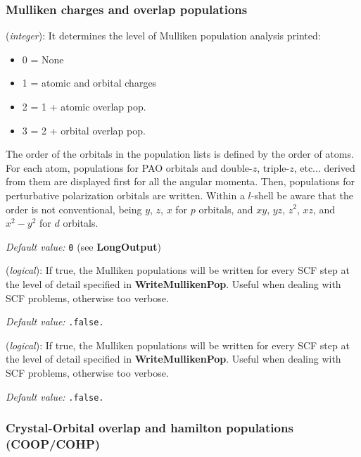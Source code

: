 \documentclass[11pt]{article}
\begin{document}
\subsubsection{Mulliken charges and overlap populations}
\begin{description}
\itemsep 10pt
\parsep 0pt

\item[{\bf WriteMullikenPop}] ({\it integer}):
It determines the level of Mulliken population analysis printed:
\begin{itemize}
\item 0 = None
\item 1 = atomic and orbital charges
\item 2 = 1 + atomic overlap pop.
\item 3 = 2 + orbital overlap pop.
\end{itemize}
The order of the orbitals in the population lists is defined
by the order of atoms. For each atom, populations for PAO orbitals and
double-$z$, triple-$z$, etc... derived from them are displayed first for
all the angular momenta. Then, populations for perturbative polarization
orbitals are written.
Within a $l$-shell be aware that the order is not
conventional, being $y$, $z$, $x$ for $p$ orbitals, and
$xy$, $yz$, $z^2$, $xz$, and $x^2-y^2$ for $d$ orbitals.

{\it Default value:} {\tt 0} (see {\bf LongOutput})


\item[{\bf MullikenInSCF}] ({\it logical}):
If true, the Mulliken populations will be written for every SCF step
at the level of detail specified in {\bf WriteMullikenPop}. Useful
when dealing with SCF problems, otherwise too verbose.

{\it Default value:} {\tt .false.}

\item[{\bf MullikenInSCF}] ({\it logical}):
If true, the Mulliken populations will be written for every SCF step
at the level of detail specified in {\bf WriteMullikenPop}. Useful
when dealing with SCF problems, otherwise too verbose.

{\it Default value:} {\tt .false.}

\end{description}

\subsubsection{Crystal-Orbital overlap and hamilton populations (COOP/COHP)}
\label{sec:coop}
\end{document}
